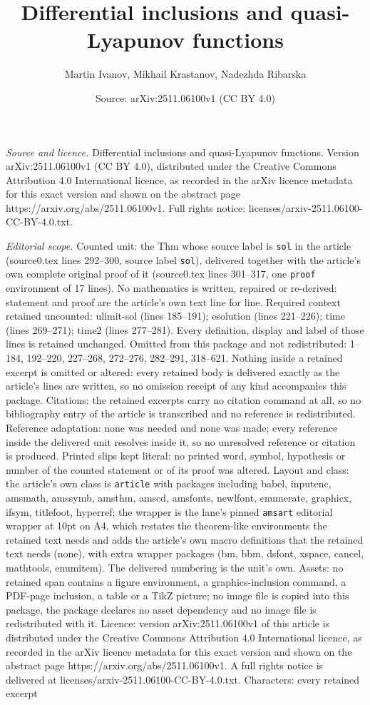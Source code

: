 \documentclass[10pt,a4paper]{amsart}
\title[Differential inclusions and quasi-Lyapunov functions]{Differential inclusions and quasi-Lyapunov functions}
\author{Martin Ivanov, Mikhail Krastanov, Nadezhda Ribarska}
\date{Source: arXiv:2511.06100v1 (CC BY 4.0)}
\begin{document}
\maketitle

\noindent\emph{Source and licence.} Differential inclusions and quasi-Lyapunov functions. Version arXiv:2511.06100v1 (CC BY 4.0), distributed under the Creative Commons Attribution 4.0 International licence, as recorded in the arXiv licence metadata for this exact version and shown on the abstract page https://arxiv.org/abs/2511.06100v1. Full rights notice: licenses/arxiv-2511.06100-CC-BY-4.0.txt.\par\smallskip

\noindent\textit{Editorial scope.} Counted unit: the Thm whose source label is \texttt{sol} in the article (source0.tex lines 292--300, source label \texttt{sol}), delivered together with the article's own complete original proof of it (source0.tex lines 301--317, one \texttt{proof} environment of 17 lines). No mathematics is written, repaired or re-derived: statement and proof are the article's own text line for line. Required context retained uncounted: ulimit-sol (lines 185--191); esolution (lines 221--226); time (lines 269--271); time2 (lines 277--281). Every definition, display and label of those lines is retained unchanged. Omitted from this package and not redistributed: 1--184, 192--220, 227--268, 272--276, 282--291, 318--621. Nothing inside a retained excerpt is omitted or altered: every retained body is delivered exactly as the article's lines are written, so no omission receipt of any kind accompanies this package. Citations: the retained excerpts carry no citation command at all, so no bibliography entry of the article is transcribed and no reference is redistributed. Reference adaptation: none was needed and none was made; every reference inside the delivered unit resolves inside it, so no unresolved reference or citation is produced. Printed slips kept literal: no printed word, symbol, hypothesis or number of the counted statement or of its proof was altered. Layout and class: the article's own class is \texttt{article} with packages including babel, inputenc, amsmath, amssymb, amsthm, amscd, amsfonts, newlfont, enumerate, graphicx, ifsym, titlefoot, hyperref; the wrapper is the lane's pinned \texttt{amsart} editorial wrapper at 10pt on A4, which restates the theorem-like environments the retained text needs and adds the article's own macro definitions that the retained text needs (none), with extra wrapper packages (bm, bbm, dsfont, xspace, cancel, mathtools, enumitem). The delivered numbering is the unit's own. Assets: no retained span contains a figure environment, a graphics-inclusion command, a PDF-page inclusion, a table or a TikZ picture; no image file is copied into this package, the package declares no asset dependency and no image file is redistributed with it. Licence: version arXiv:2511.06100v1 of this article is distributed under the Creative Commons Attribution 4.0 International licence, as recorded in the arXiv licence metadata for this exact version and shown on the abstract page https://arxiv.org/abs/2511.06100v1. A full rights notice is delivered at licenses/arxiv-2511.06100-CC-BY-4.0.txt. Characters: every retained excerpt 
\end{document}
